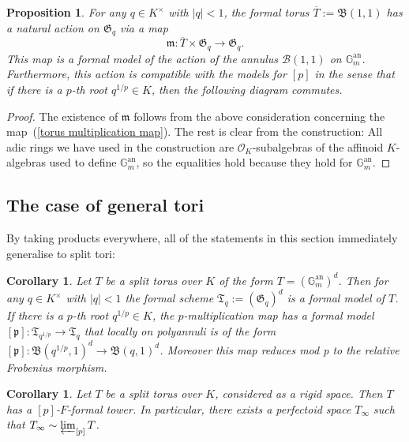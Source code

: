 \documentclass[10pt,oneside]{amsart}
\newtheorem{proposition}[theorem]{Proposition}
\newtheorem{corollary}[theorem]{Corollary}
\theoremstyle{definition}
\begin{document}
	\begin{proposition}\label{action on formal model of torus}
		For any $q\in K^\times$ with $|q|<1$, the formal torus $\overline{T}:=\mathfrak B(1,1)$ has a natural action on $\mathfrak G_q$ via a map
		\[\mathfrak m:\overline{T}\times \mathfrak G_q\rightarrow \mathfrak G_q.\]
		This map is a formal model of the action of the annulus $\mathcal B(1,1)$ on $\mathbb G_m^{\operatorname{an}}$. Furthermore, this action is compatible with the models for $[p]$ in the sense that if there is a $p$-th root $q^{1/p}\in K$, then the following diagram commutes.
		\begin{center}
		\end{center}
	\end{proposition} 
	\begin{proof}
		The existence of $\mathfrak m$ follows from the above consideration concerning the map~(\ref{torus multiplication map}). The rest is clear from the construction: All adic rings we have used in the construction are $\mathcal O_K$-subalgebras of the affinoid $K$-algebras used to define $\mathbb G_m^{\operatorname{an}}$, so the equalities hold because they hold for $\mathbb G_m^{\operatorname{an}}$.
	\end{proof}
	
	\subsection{The case of general tori}
	By taking products everywhere, all of the statements in this section immediately generalise to split tori:
	\begin{corollary}\label{torus has formal models}
		Let $T$ be a split torus over $K$ of the form $T=(\mathbb G_m^{\operatorname{an}})^d$. Then for any $q\in K^\times$ with $|q|<1$ the formal scheme $\mathfrak T_q := (\mathfrak G_q)^d$ is a formal model of $T$. If there is a $p$-th root $q^{1/p}\in K$, the $p$-multiplication map has a formal model $[\mathfrak p]:\mathfrak T_{q^{1/p}}\rightarrow \mathfrak T_{q}$ that locally on polyannuli is of the form $[\mathfrak p]:\mathfrak B(q^{1/p},1)^d\rightarrow \mathfrak B(q,1)^d$. Moreover this map reduces mod p to the relative Frobenius morphism.
	\end{corollary}
	\begin{corollary}\label{torus has p-F-formal tower and has perfectoid tilde-limit}
		Let $T$ be a split torus over $K$, considered as a rigid space. Then $T$ has a $[p]$-$F$-formal tower. In particular, there exists a perfectoid space $T_\infty$ such that $T_\infty \sim \varprojlim_{[p]} T$. 
	\end{corollary}
	
\end{document}
